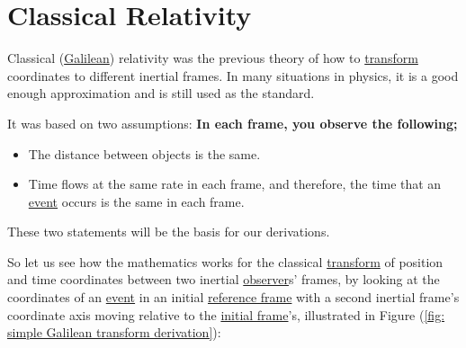 \section{Classical Relativity} \label{sect: Classical Relativity}

Classical (\hyperlink{def-galilean-transform}{Galilean}) relativity was the previous theory of how to \hyperlink{def-transform}{transform} coordinates to different inertial frames.
In many situations in physics, it is a good enough approximation and is still used as the standard.

It was based on two assumptions: \textbf{In each frame, you observe the following;}

\begin{itemize}
	\item The distance between objects is the same.
	\item Time flows at the same rate in each frame, and therefore, the time that an \hyperlink{def-event}{event} occurs is the same in each frame.
\end{itemize}

These two statements will be the basis for our derivations.


So let us see how the mathematics works for the classical \hyperlink{def-transform}{transform} of position and time coordinates between two inertial \hyperlink{def-observer}{observer}s' frames, by looking at the coordinates of an \hyperlink{def-event}{event} in an initial \hyperlink{def-Reference-frame}{reference frame} with a second inertial frame's coordinate axis moving relative to the \hyperlink{def-initial-Frame}{initial frame}'s, illustrated in Figure (\ref{fig: simple Galilean transform derivation}):


